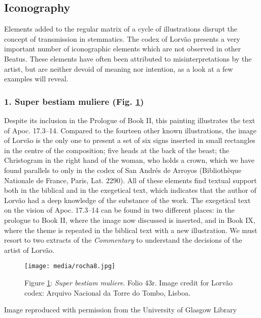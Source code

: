\documentclass{article}
\begin{document}
\subsection*{Iconography}

Elements added to the regular matrix of a cycle of illustrations disrupt
the concept of transmission in stemmatics. The codex of Lorvão presents
a very important number of iconographic elements which are not observed
in other Beatus. These elements have often been attributed to
misinterpretations by the artist, but are neither devoid of meaning nor
intention, as a look at a few examples will reveal.

\subsubsection{1. Super bestiam muliere (Fig. \ref{fig:rocha:super})} Despite its
inclusion in the Prologue of Book II, this painting illustrates the text
of Apoc. 17.3--14. Compared to the fourteen other known illustrations,
the image of Lorvão is the only one to present a set of six signs
inserted in small rectangles in the centre of the composition; five
heads at the back of the beast; the Christogram in the right hand of the
woman, who holds a crown, which we have found parallels to only in the
codex of San Andrés de Arroyos (Bibliothèque Nationale de France, Paris,
Lat. 2290). All of these elements find textual support both in the
biblical and in the exegetical text, which indicates that the author of
Lorvão had a deep knowledge of the substance of the work. The exegetical
text on the vision of Apoc. 17.3--14 can be found in two different
places: in the prologue to Book II, where the image now discussed is
inserted, and in Book IX, where the theme is repeated in the biblical
text with a new illustration. We must resort to two extracts of the
\emph{Commentary} to understand the decisions of the artist of Lorvão.

\begin{figure}[H]
    \centering
    \texttt{[image: media/rocha8.jpg]}
    \caption{Figure \ref{fig:rocha:super}: \emph{Super bestiam muliere}. Folio 43r. Image credit for Lorvão codex: Arquivo Nacional da Torre do Tombo, Lisboa.}
    \label{fig:rocha:super}
\end{figure}


 Image reproduced with permission from the University of Glasgow Library 
\end{document}
